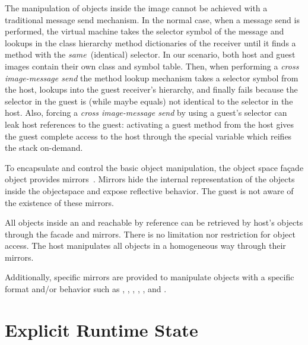 The manipulation of objects inside the \objectspace image cannot be achieved with a traditional message send mechanism. In the normal case, when a message send is performed, the virtual machine takes the selector symbol of the message and lookups in the class hierarchy method dictionaries of the receiver until it finds a method with the \emph{same}~(identical) selector. In our scenario, both host and guest images contain their own  class and symbol table. Then, when performing a \emph{cross image-message send} the method lookup mechanism takes a selector symbol from the host, lookups into the guest receiver's hierarchy, and finally fails because  the selector in the guest is (while maybe equals) not identical to the selector in the host. Also, forcing a \emph{cross image-message send} by using a guest's selector can leak host references to the guest: activating a guest method from the host gives the guest complete access to the host through the  special variable which reifies the stack on-demand.

To encapsulate and control the basic object manipulation, the object space fa\c{c}ade object provides mirrors~\cite{Brac04b}. Mirrors hide the internal representation of the objects inside the objectspace and expose reflective behavior. The guest is not aware of the existence of these mirrors.

All objects inside an \objectspace and reachable by reference can be retrieved by host's objects through the \objectspace facade and mirrors. 
There is no limitation nor restriction for object access. 
The host manipulates all objects in a homogeneous way through their mirrors. 

Additionally, specific mirrors are provided to manipulate objects with a specific format and/or behavior such as , , , , , and .

\section{Explicit Runtime State}

